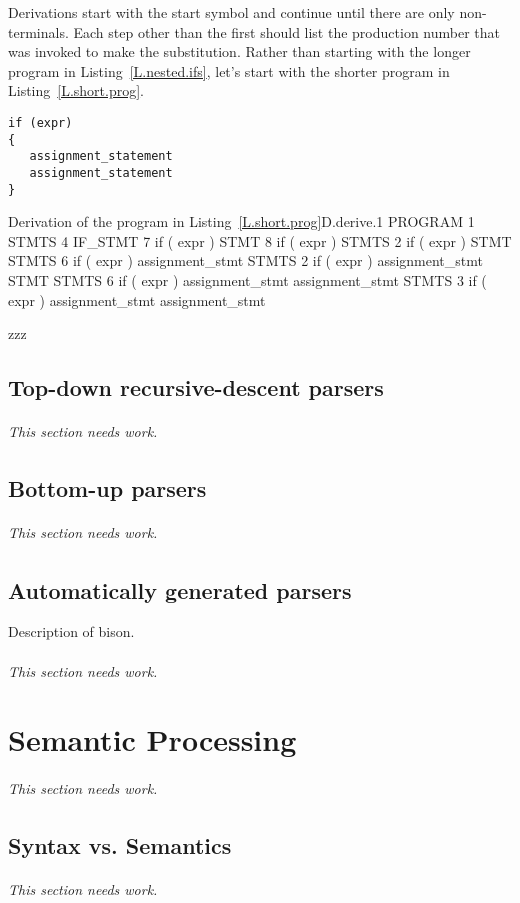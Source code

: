\documentclass[letterpaper,12pt,openany,reqno]{book}%
\newcommand{\needswork}{\paragraph{This section needs work.}}
\begin{document}
Derivations start with the start symbol and continue until there are only non-terminals. Each step other than the first should list the production number that was invoked to make the substitution. Rather than starting with the longer program in Listing~\ref{L.nested.ifs}, let's start with the shorter program in Listing~\ref{L.short.prog}.

\begin{lstlisting}[caption={Short program program in the language defined by the CFG in Figure~\ref{F.cfg.2}. The derivation of this program is given in Derivation~\ref{D.derive.1}},label=L.short.prog]
if (expr)
{
   assignment_statement
   assignment_statement
}
\end{lstlisting}

\begin{derivation}{Derivation of the program in Listing~\ref{L.short.prog}}{D.derive.1}
    PROGRAM
1   STMTS
4   IF_STMT
7   if ( expr ) STMT
8   if ( expr ) { STMTS }
2   if ( expr ) { STMT STMTS }
6   if ( expr ) { assignment_stmt STMTS }
2   if ( expr ) { assignment_stmt STMT STMTS }
6   if ( expr ) { assignment_stmt assignment_stmt STMTS }
3   if ( expr ) { assignment_stmt assignment_stmt }
\end{derivation}

zzz

\chapter {Top-down recursive-descent parsers}
\needswork{}

\chapter {Bottom-up parsers}
\needswork{}

\chapter {Automatically generated parsers}
Description of bison.
\needswork{}

\part {Semantic Processing}
\needswork{}

\chapter {Syntax vs. Semantics}
\needswork{}
\end{document}
